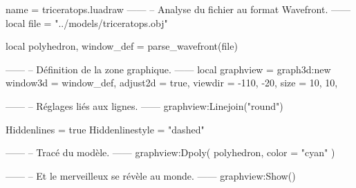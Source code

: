 \documentclass{standalone}
\begin{document}
\begin{luadraw}{name = triceratops.luadraw}
------
-- Analyse du fichier au format Wavefront.
------
local file = "../models/triceratops.obj"

local polyhedron, window_def = parse_wavefront(file)

------
-- Définition de la zone graphique.
------
local graphview = graph3d:new{
  window3d = window_def,
  adjust2d = true,
  viewdir  = {-110, -20},
  size     = {10, 10},
}

------
-- Réglages liés aux lignes.
------
graphview:Linejoin("round")

Hiddenlines = true
Hiddenlinestyle = "dashed"

------
-- Tracé du modèle.
------
graphview:Dpoly(
  polyhedron,
  {
    color = "cyan"
  })

------
-- Et le merveilleux se révèle au monde.
------
graphview:Show()
\end{luadraw}
\end{document}
